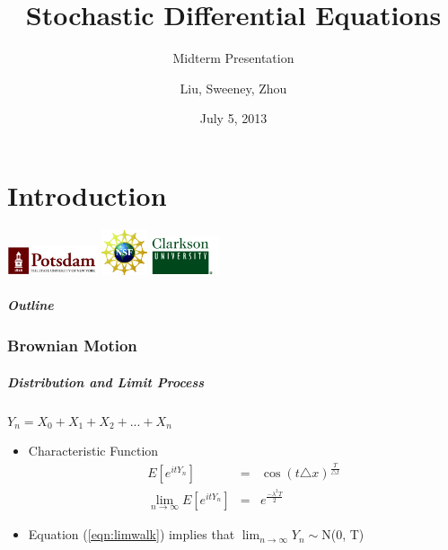 \documentclass{beamer}   %
\begin{document}
\part{Introduction}


\title{Stochastic Differential Equations}
\subtitle{Midterm Presentation}

\author{Liu, Sweeney, Zhou}
\date{July 5, 2013}

\begin{frame}[plain]
  \titlepage
  \begin{center}
  \includegraphics[width=0.2\textwidth]{SUNYPotsdam}
  \includegraphics[width=0.1\textwidth]{nsf_logobig}
  \includegraphics[width=0.15\textwidth]{clarksonGreen}
\end{center}
\end{frame}

\begin{frame}
  \frametitle{Outline}
  \vspace{-5mm}
\end{frame}



\section{Brownian Motion}


\begin{frame}
    \frametitle{Distribution and Limit Process}
	\begin{center}
		$Y_{n} = X_{0}+ X_{1}+X_{2}+...+X_{n}$
	\end{center}
	\begin{itemize}
		\item Characteristic Function
			\begin{eqnarray}
				E[e^{itY_{n}}]&=& \cos(t\triangle x)^{\frac{T}{\triangle t}}\\
				\lim_{n\rightarrow \infty} E[e^{itY_{n}}]&=& e^{\frac{-\lambda^{2} T}{2}} \label{eqn:limwalk}
			\end{eqnarray}
		\item Equation (\ref{eqn:limwalk}) implies that $ \lim_{n\rightarrow \infty} Y_{n} \sim $N(0, T)			
	\end{itemize}

\end{frame}
\end{document}
